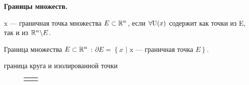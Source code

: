 \smallskip

 \textbf{Границы множеств.}

\Def x --- граничная точка множества $E \subset \mathbb{R}^n$, если $\forall \text{U}(x)$ содержит как точки из E, так и из $\mathbb{R}^n \backslash E$.

\Def Граница множества  $E \subset \mathbb{R}^n$ : $\partial E = \left\{ x  \text{ | x --- граничная точка } E \right\}$.

\Example граница круга и изолированной точки

\begin{figure}[h]
	\begin{center}
	    	\begin{minipage}[h]{0.49\linewidth}
		\end{minipage}
		\hfill
		\begin{minipage}[h]{0.49\linewidth}
		\end{minipage}
		\begin{minipage}[h]{1\linewidth}
			\begin{tabular}{p{0.49\linewidth}p{0.49\linewidth}}
				\centering {E} & 
				\centering {$\partial E$} \\
			\end{tabular}
		\end{minipage}
	\end{center}
	\vspace*{-1cm}
	\caption {}
\end{figure}

